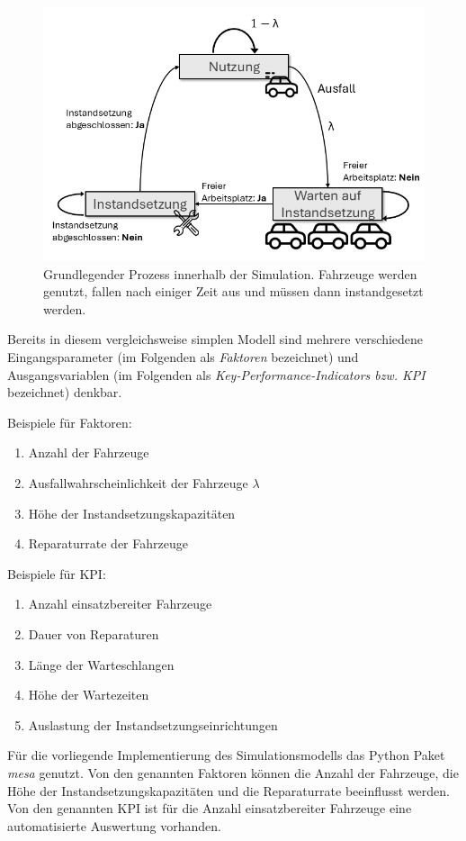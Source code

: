 \documentclass[11pt,a4paper]{article}
\begin{document}
\begin{figure}
	\label{fig:Simulationsmodell}
	\centering
	\includegraphics[width=\textwidth]{media/Simulationsmodell.png}
	\caption{
		Grundlegender Prozess innerhalb der Simulation. Fahrzeuge werden
		genutzt, fallen nach einiger Zeit aus und müssen dann instandgesetzt
		werden.
	}
\end{figure}

Bereits in diesem vergleichsweise simplen Modell sind mehrere verschiedene Eingangsparameter (im Folgenden als \emph{Faktoren} bezeichnet)
und Ausgangsvariablen (im Folgenden als \emph{Key-Performance-Indicators bzw. KPI} bezeichnet) denkbar.

Beispiele für Faktoren:
\begin{enumerate}
	\item Anzahl der Fahrzeuge
	\item Ausfallwahrscheinlichkeit der Fahrzeuge $\lambda$
	\item Höhe der Instandsetzungskapazitäten
	\item Reparaturrate der Fahrzeuge
\end{enumerate}
Beispiele für KPI:
\begin{enumerate}
	\item Anzahl einsatzbereiter Fahrzeuge
	\item Dauer von Reparaturen
	\item Länge der Warteschlangen
	\item Höhe der Wartezeiten
	\item Auslastung der Instandsetzungseinrichtungen
\end{enumerate}

Für die vorliegende Implementierung des Simulationsmodells das Python Paket \emph{mesa} \cite{python-mesa-2020} genutzt.
Von den genannten Faktoren können die Anzahl der Fahrzeuge, die Höhe der Instandsetzungskapazitäten und die
Reparaturrate beeinflusst werden. Von den genannten KPI ist für die Anzahl einsatzbereiter Fahrzeuge
eine automatisierte Auswertung vorhanden.
\end{document}
